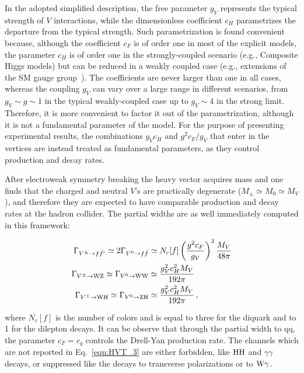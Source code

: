 In the adopted simplified description, the free parameter $g_V$ represents the typical strength of $V$ interactions, while the dimensionless coefficient $c_H$ parametrizes the departure from the typical strength.
Such parametrization is found convenient because, although the coefficient $c_F$ is of order one in most of the explicit models, the parameter $c_H$ is of order one in the strongly-coupled scenario (e.g., Composite Higgs models) but can be reduced in a weakly coupled case (e.g., extensions of the SM gauge group~\cite{PhysRevD.22.727,Altarelli}). The coefficients are never larger than one in all cases, whereas the coupling $g_V$ can vary over a large range in different scenarios, from $g_V \sim g \sim 1$ in the typical weakly-coupled case up to $g_V \sim 4$ in the strong limit. Therefore, it is more convenient to factor it out of the parametrization, although it is not a fundamental parameter of the model. For the purpose of presenting experimental results, the combinations $g_Vc_H$ and $g^2c_F/g_V$ that enter in the vertices are instead treated as fundamental parameters, as they control production and decay rates.

After electroweak symmetry breaking the heavy vector acquires mass and one finds that the charged and neutral $V$'s are practically degenerate ($M_\pm \simeq M_0 \simeq M_V$),
and therefore they are expected to have comparable production and decay rates at the hadron collider. The partial widths are as well immediately computed in this framework:

\begin{eqnarray}\label{eqn:HVT_3}
\Gamma_{V^\pm \rightarrow f\bar{f}^\prime} \simeq 2\Gamma_{V^0 \rightarrow f\bar{f}} & \simeq N_c[f] \left( \frac{g^2c_F}{g_V} \right)^2\frac{M_V}{48\pi}\nonumber \\
\Gamma_{V^\pm \rightarrow \mathrm{W}\mathrm{Z}} \simeq \Gamma_{V^0 \rightarrow \mathrm{W}\mathrm{W}} & \simeq \frac{g^2_Vc^2_HM_V}{192\pi}\\
\Gamma_{V^\pm \rightarrow \mathrm{W}\mathrm{H}} \simeq \Gamma_{V^0 \rightarrow \mathrm{Z}\mathrm{H}} & \simeq \frac{g^2_Vc^2_HM_V}{192\pi}\, , \nonumber
\end{eqnarray}

\noindent where $N_c[f]$ is the number of colors and is equal to three for the diquark and to 1 for the dilepton decays.
It can be observe that through the partial width to qq, the parameter $c_F = c_q$ controls the Drell-Yan production rate.
The channels which are not reported in Eq.~\ref{eqn:HVT_3} are either forbidden, like $\mathrm{H}\mathrm{H}$ and $\gamma\gamma$ decays, or suppressed like the decays to transverse polarizations or to $\mathrm{W}\gamma$.

